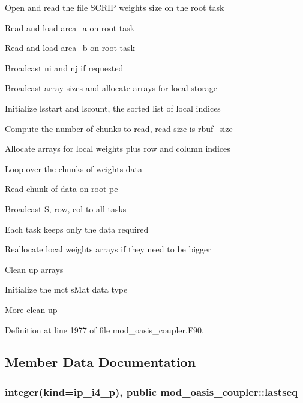 \begin{DoxyItemize}
\item Open and read the file S\+C\+R\+I\+P weights size on the root task
\item Read and load area\+\_\+a on root task
\item Read and load area\+\_\+b on root task
\item Broadcast ni and nj if requested
\item Broadcast array sizes and allocate arrays for local storage
\item Initialize lsstart and lscount, the sorted list of local indices
\item Compute the number of chunks to read, read size is rbuf\+\_\+size
\item Allocate arrays for local weights plus row and column indices
\item Loop over the chunks of weights data
\begin{DoxyItemize}
\item Read chunk of data on root pe
\item Broadcast S, row, col to all tasks
\item Each task keeps only the data required
\item Reallocate local weights arrays if they need to be bigger
\end{DoxyItemize}
\item Clean up arrays
\item Initialize the mct s\+Mat data type
\item More clean up 
\end{DoxyItemize}

Definition at line 1977 of file mod\+\_\+oasis\+\_\+coupler.\+F90.



\subsection{Member Data Documentation}
\hypertarget{classmod__oasis__coupler_a0cb9b8a96c10385d38fa244d920c7eaf}{
\subsubsection[{lastseq}]{\setlength{\rightskip}{0pt plus 5cm}integer(kind=ip\+\_\+i4\+\_\+p), public mod\+\_\+oasis\+\_\+coupler\+::lastseq}}\label{classmod__oasis__coupler_a0cb9b8a96c10385d38fa244d920c7eaf}


